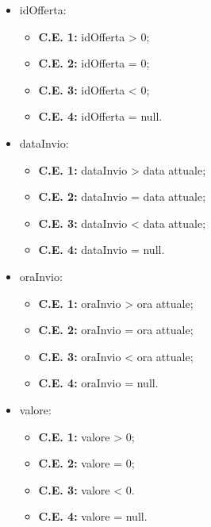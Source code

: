             \begin{itemize}
                \item idOfferta:
                    \begin{itemize}
                        \item \textbf{C.E. 1:} idOfferta \textgreater{} 0;
                        \item \textbf{C.E. 2:} idOfferta = 0;
                        \item \textbf{C.E. 3:} idOfferta \textless{} 0;
                        \item \textbf{C.E. 4:} idOfferta = null.
                    \end{itemize}
                \item dataInvio:
                    \begin{itemize}
                        \item \textbf{C.E. 1:} dataInvio \textgreater{} data attuale;
                        \item \textbf{C.E. 2:} dataInvio = data attuale;
                        \item \textbf{C.E. 3:} dataInvio \textless{} data attuale;
                        \item \textbf{C.E. 4:} dataInvio = null.
                    \end{itemize}
                \item oraInvio:
                    \begin{itemize}
                        \item \textbf{C.E. 1:} oraInvio \textgreater{} ora attuale;
                        \item \textbf{C.E. 2:} oraInvio = ora attuale;
                        \item \textbf{C.E. 3:} oraInvio \textless{} ora attuale;
                        \item \textbf{C.E. 4:} oraInvio = null. \\
                    \end{itemize}
                \item valore:
                    \begin{itemize}
                        \item \textbf{C.E. 1:} valore \textgreater{} 0;
                        \item \textbf{C.E. 2:} valore = 0;
                        \item \textbf{C.E. 3:} valore \textless{} 0.
                        \item \textbf{C.E. 4:} valore = null.
                    \end{itemize}
            \end{itemize}


